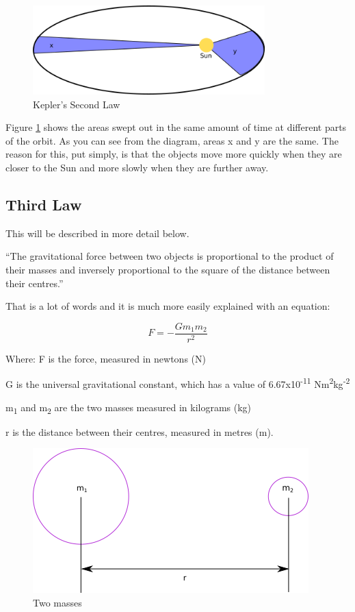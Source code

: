 \documentclass[revision-guide.tex]{subfiles}
\begin{document}
\begin{figure}[h]
  \begin{center}
    \includegraphics[width=0.8\textwidth]{figs/chapt-13/kepler-2.png}
  \end{center}
  \caption{Kepler's Second Law}
  \label{kepler-2}
\end{figure}

Figure \ref{kepler-2} shows the areas swept out in the same amount of time at different parts of the orbit. As you can see from the diagram, areas x and y are the same. The reason
for this, put simply, is that the objects move more quickly when they
are closer to the Sun and more slowly when they are further away.

\subsection{Third Law}

This will be described in more detail below.



``The gravitational force between two objects is proportional to the
product of their masses and inversely proportional to the square of the
distance between their centres.''

That is a lot of words and it is much more easily explained with an
equation:

\[F = - \frac{Gm_{1}m_{2}}{r^{2}}\]

Where: F is the force, measured in newtons (N)

G is the universal gravitational constant, which has a value of
6.67x10\textsuperscript{-11} Nm\textsuperscript{2}kg\textsuperscript{-2}

m\textsubscript{1} and m\textsubscript{2} are the two masses measured in
kilograms (kg)

r is the distance between their centres, measured in metres (m).

\begin{figure}[h]
  \begin{center}
    \includegraphics{figs/chapt-13/masses.png}
  \end{center}
  \label{masses}
  \caption{Two masses}
\end{figure}
\end{document}
